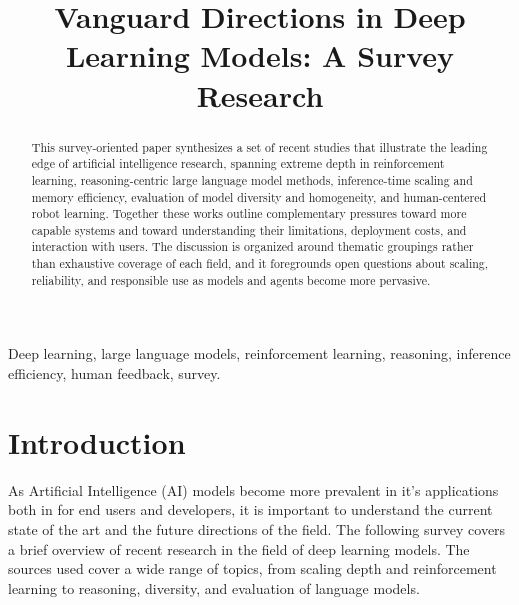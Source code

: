 \documentclass[conference]{IEEEtran}
\newcommand{\PaperTitle}{Vanguard Directions in Deep Learning Models: A Survey Research}
\begin{document}
\title{\PaperTitle\\
}

\author{
\and
{}
\and
{}
\and
{}
}

\maketitle

\begin{abstract}
This survey-oriented paper synthesizes a set of recent studies that illustrate the leading edge of artificial intelligence research, spanning extreme depth in reinforcement learning, reasoning-centric large language model methods, inference-time scaling and memory efficiency, evaluation of model diversity and homogeneity, and human-centered robot learning. Together these works outline complementary pressures toward more capable systems and toward understanding their limitations, deployment costs, and interaction with users. The discussion is organized around thematic groupings rather than exhaustive coverage of each field, and it foregrounds open questions about scaling, reliability, and responsible use as models and agents become more pervasive.
\end{abstract}

\begin{IEEEkeywords}
Deep learning, large language models, reinforcement learning, reasoning, inference efficiency, human feedback, survey.
\end{IEEEkeywords}

\section{Introduction}
As Artificial Intelligence (AI) models become more prevalent in it's applications both in for end users and developers, it is important to understand the current state of the art and the future directions of the field.
\newline
The following survey covers a brief overview of recent research in the field of deep learning models. The sources used cover a wide range of topics, from scaling depth and reinforcement learning to reasoning, diversity, and evaluation of language models.
\end{document}
